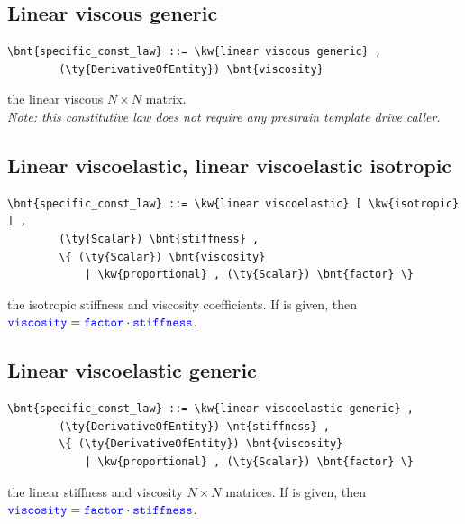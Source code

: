 \subsection{Linear viscous generic}
\begin{Verbatim}[commandchars=\\\{\}]
    \bnt{specific_const_law} ::= \kw{linear viscous generic} , 
        (\ty{DerivativeOfEntity}) \bnt{viscosity}
\end{Verbatim}
the linear viscous $N \times N $ matrix. \\
{\em 
    Note: this constitutive law does not require any prestrain template
    drive caller.
}
  
\subsection{Linear viscoelastic, linear viscoelastic isotropic}
\begin{Verbatim}[commandchars=\\\{\}]
    \bnt{specific_const_law} ::= \kw{linear viscoelastic} [ \kw{isotropic} ] ,
        (\ty{Scalar}) \bnt{stiffness} ,
        \{ (\ty{Scalar}) \bnt{viscosity}
            | \kw{proportional} , (\ty{Scalar}) \bnt{factor} \}
\end{Verbatim}
the isotropic stiffness and viscosity coefficients.
If  is given, then
$\textcolor{blue}{\texttt{viscosity}} = \textcolor{blue}{\texttt{factor}} \cdot \textcolor{blue}{\texttt{stiffness}}$.
  
\subsection{Linear viscoelastic generic}
\begin{Verbatim}[commandchars=\\\{\}]
    \bnt{specific_const_law} ::= \kw{linear viscoelastic generic} ,  
        (\ty{DerivativeOfEntity}) \nt{stiffness} ,
        \{ (\ty{DerivativeOfEntity}) \bnt{viscosity} 
            | \kw{proportional} , (\ty{Scalar}) \bnt{factor} \}
\end{Verbatim}
the linear stiffness and viscosity $N \times N$ matrices.
If  is given, then
$\textcolor{blue}{\texttt{viscosity}} = \textcolor{blue}{\texttt{factor}} \cdot \textcolor{blue}{\texttt{stiffness}}$.
  
